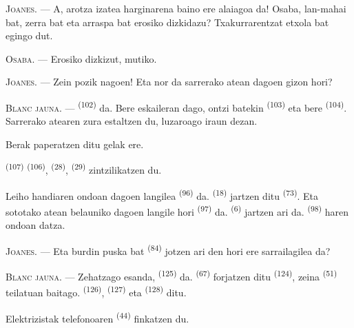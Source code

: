 \textsc{Joanes}. --- A, arotza izatea harginarena baino ere alaiagoa da! Osaba,
lan-mahai bat, zerra bat eta arraspa bat erosiko dizkidazu? Txakurrarentzat
etxola bat egingo dut.

\textsc{Osaba}. --- Erosiko dizkizut, mutiko.

\textsc{Joanes}. --- Zein pozik nagoen! Eta nor da sarrerako atean dagoen gizon
hori?

\VUsaut{3.0mm}
\VUsaut{3.0mm}

\textsc{Blanc jauna}. ---  \textsuperscript{(102)} da. Bere
eskaileran dago,  ontzi batekin \textsuperscript{(103)} eta bere
 \textsuperscript{(104)}. Sarrerako atearen zura estaltzen
du, luzaroago iraun dezan.

Berak paperatzen ditu gelak ere.

 \textsuperscript{(107)} 
\textsuperscript{(106)},  \textsuperscript{(28)},
 \textsuperscript{(29)} zintzilikatzen du.

Leiho handiaren ondoan dagoen langilea 
\textsuperscript{(96)} da.  \textsuperscript{(18)} jartzen ditu
 \textsuperscript{(73)}. Eta sototako atean belauniko dagoen
langile hori  \textsuperscript{(97)} da. 
\textsuperscript{(6)} jartzen ari da.  \textsuperscript{(98)} haren
ondoan datza.

\textsc{Joanes}. --- Eta burdin puska bat 
\textsuperscript{(84)} jotzen ari den hori ere sarrailagilea da?

\textsc{Blanc jauna}. --- Zehatzago esanda, 
\textsuperscript{(125)} da.  \textsuperscript{(67)}
forjatzen ditu  \textsuperscript{(124)}, zeina
 \textsuperscript{(51)} teilatuan baitago.
 \textsuperscript{(126)}, 
\textsuperscript{(127)} eta  \textsuperscript{(128)} ditu.

Elektrizistak telefonoaren  \textsuperscript{(44)}
finkatzen du.

\VUsaut{3.0mm}

